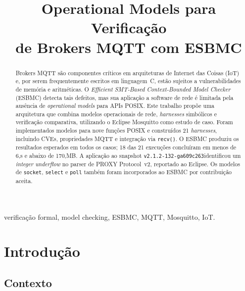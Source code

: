 \documentclass[conference]{IEEEtran}
\newcommand{\mosqsnapshot}{\texttt{v2.1.2-132-ga609c263}}
\begin{document}
\title{Operational Models para Verifica\c{c}\~ao\\
de Brokers MQTT com ESBMC}

\author{
\and
{}
\and
{}
}

\maketitle

\begin{abstract}
Brokers MQTT s\~ao componentes cr\'iticos em arquiteturas de Internet das Coisas
(IoT) e, por serem frequentemente escritos em linguagem~C, est\~ao sujeitos a
vulnerabilidades de mem\'oria e aritm\'eticas. O \emph{Efficient SMT-Based
Context-Bounded Model Checker} (ESBMC) detecta tais defeitos, mas sua aplica\c{c}\~ao
a software de rede \'e limitada pela aus\^encia de \emph{operational models} para
APIs POSIX. Este trabalho prop\~oe uma arquitetura que combina modelos operacionais
de rede, \emph{harnesses} simb\'olicos e verifica\c{c}\~ao comparativa, utilizando o
Eclipse Mosquitto como estudo de caso. Foram implementados modelos para nove
fun\c{c}\~oes POSIX e constru\'idos 21 \emph{harnesses}, incluindo CVEs, propriedades
MQTT e integra\c{c}\~ao via \texttt{recv()}. O ESBMC produziu os resultados
esperados em todos os casos; 18 das 21 execu\c{c}\~oes conclu\'iram em menos de
6,s e abaixo de 170,MB. A aplica\c{c}\~ao ao snapshot \mosqsnapshot identificou
um \emph{integer underflow} no parser de PROXY Protocol~v2, reportado ao Eclipse.
Os modelos de \texttt{socket}, \texttt{select} e \texttt{poll} tamb\'em foram
incorporados ao ESBMC por contribui\c{c}\~ao aceita.
\end{abstract}

\begin{IEEEkeywords}
verifica\c{c}\~ao formal, model checking, ESBMC, MQTT, Mosquitto, IoT.
\end{IEEEkeywords}

\section{Introdu\c{c}\~ao}

\subsection{Contexto}
\label{sec:contexto}
\end{document}
